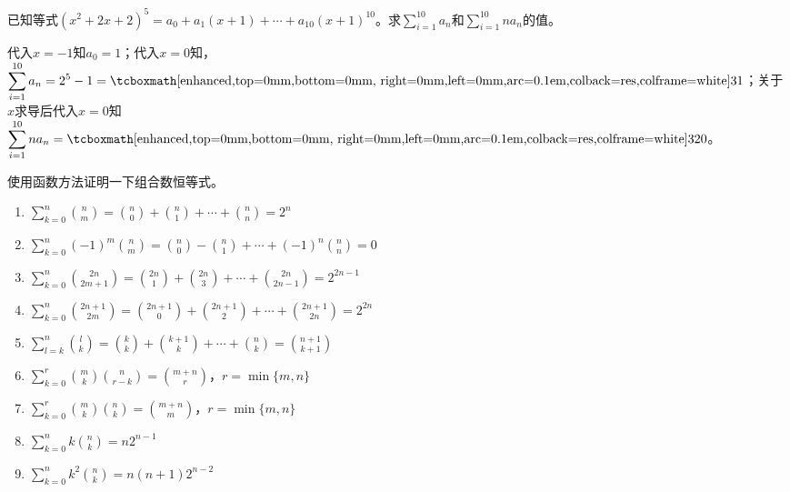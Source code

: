 \begin{que}
	已知等式$(x^2+2x+2)^5=a_0+a_1(x+1)+\cdots+a_{10}(x+1)^{10}$。求$\displaystyle\sum_{i=1}^{10}a_n$和$\displaystyle\sum_{i=1}^{10}na_n$的值。
\end{que}
\sol 代入$x=-1$知$a_0=1$；代入$x=0$知，$\displaystyle\sum_{i=1}^{10}a_n=2^5-1=\res{31}$；关于$x$求导后代入$x=0$知$\displaystyle\sum_{i=1}^{10}na_n=\res{320}$。\par\hfill{}\easy

\begin{que}
	使用函数方法证明一下组合数恒等式。
	\begin{enumerate}
		\item $\displaystyle\sum_{k=0}^n\binom{n}{m}=\binom{n}{0}+\binom{n}{1}+\cdots+\binom{n}{n}=2^n$
		\item $\displaystyle\sum_{k=0}^n(-1)^m\binom{n}{m}=\binom{n}{0}-\binom{n}{1}+\cdots+(-1)^n\binom{n}{n}=0$
		\item $\displaystyle\sum_{k=0}^n\binom{2n}{2m+1}=\binom{2n}{1}+\binom{2n}{3}+\cdots+\binom{2n}{2n-1}=2^{2n-1}$
		\item $\displaystyle\sum_{k=0}^n\binom{2n+1}{2m}=\binom{2n+1}{0}+\binom{2n+1}{2}+\cdots+\binom{2n+1}{2n}=2^{2n}$
		\item $\displaystyle\sum_{l=k}^{n}\binom{l}{k}=\binom{k}{k}+\binom{k+1}{k}+\cdots+\binom{n}{k}=\binom{n+1}{k+1}$
		\item $\displaystyle\sum_{k=0}^r\binom{m}{k}\binom{n}{r-k}=\binom{m+n}{r}$，$r=\min\{m,n\}$
		\item $\displaystyle\sum_{k=0}^r\binom{m}{k}\binom{n}{k}=\binom{m+n}{m}$，$r=\min\{m,n\}$
		\item $\displaystyle\sum_{k=0}^n k\binom{n}{k}=n2^{n-1}$
		\item $\displaystyle\sum_{k=0}^n k^2\binom{n}{k}=n(n+1)2^{n-2}$
	\end{enumerate}
\end{que}
